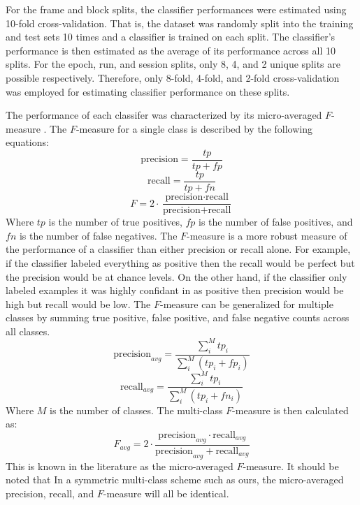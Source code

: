 \documentclass[twocolumn,final]{article}
\begin{document}
For the frame and block splits, the classifier performances were estimated using 10-fold cross-validation.
That is, the dataset was randomly split into the training and test sets 10 times and a classifier is trained on each split.
The classifier's performance is then estimated as the average of its performance across all 10 splits.
For the epoch, run, and session splits, only 8, 4, and 2 unique splits are possible respectively.
Therefore, only 8-fold, 4-fold, and 2-fold cross-validation was employed for estimating classifier performance on these splits.

The performance of each classifer was characterized by its micro-averaged $F$-measure \cite{Ozgur2005}. 
The $F$-measure for a single class is described by the following equations:
\begin{equation}
\mbox{precision} = \frac{tp}{tp + fp}
\label{eqn:precision}
\end{equation}
\begin{equation}
\mbox{recall} = \frac{tp}{tp + fn}
\label{eqn:recall}
\end{equation}
\begin{equation}
F = 2 \cdot \frac{\mbox{precision} \cdot \mbox{recall}}{\mbox{precision} + \mbox{recall}}
\label{eqn:f1}
\end{equation}
Where $tp$ is the number of true positives, $fp$ is the number of false positives, and $fn$ is the number of false negatives.
The $F$-measure is a more robust measure of the performance of a classifier than either precision or recall alone.
For example, if the classifier labeled everything as positive then the recall would be perfect but the precision would be at chance levels.
On the other hand, if the classifier only labeled examples it was highly confidant in as positive then precision would be high but recall would be low.
The $F$-measure can be generalized for multiple classes by summing true positive, false positive, and false negative counts across all classes.
\begin{equation}
\mbox{precision}_{avg} =\frac{\sum_{i}^{M}{tp_{i}}}{\sum_{i}^{M}{\left( tp_{i} + fp_{i} \right)}}
\end{equation}
\begin{equation}
\mbox{recall}_{avg} = \frac{\sum_{i}^{M}{tp_{i}}}{\sum_{i}^{M}{\left( tp_{i} + fn_{i} \right)}}
\end{equation}
Where $M$ is the number of classes.
The multi-class $F$-measure is then calculated as:
\begin{equation}
F_{avg} = 2 \cdot \frac{\mbox{precision}_{avg} \cdot \mbox{recall}_{avg}}{\mbox{precision}_{avg} + \mbox{recall}_{avg}}
\end{equation}
This is known in the literature as the  micro-averaged $F$-measure.
It should be noted that In a symmetric multi-class scheme such as ours, the micro-averaged precision, recall, and $F$-measure will all be identical.
\end{document}
